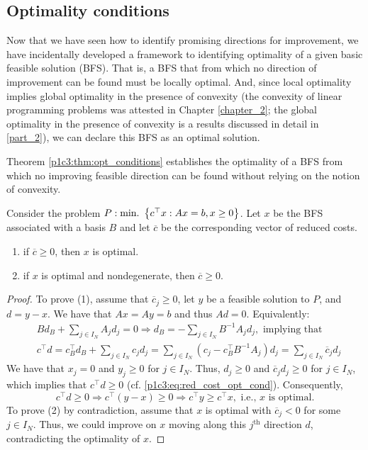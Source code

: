 \subsection{Optimality conditions}

Now that we have seen how to identify promising directions for improvement, we have incidentally developed a framework to identifying optimality of a given basic feasible solution (BFS). That is, a BFS that from which no direction of improvement can be found must be locally optimal. And, since local optimality implies global optimality in the presence of convexity (the convexity of linear programming problems was attested in Chapter \ref{chapter_2}; the global optimality in the presence of convexity is a results discussed in detail in \ref{part_2}), we can declare this BFS as an optimal solution. 

Theorem \ref{p1c3:thm:opt_conditions} establishes the optimality of a BFS from which no improving feasible direction can be found without relying on the notion of convexity.

\begin{theorem}\label{p1c3:thm:opt_conditions}
	Consider the problem $P : \mathop{\text{min.~}}\left\{ c^\top x : Ax = b, x \geq 0 \right \}$. Let $x$ be the BFS associated with a basis $B$ and let $\overline{c}$ be the corresponding vector of reduced costs.
	\begin{enumerate}
		\item if $\overline{c} \geq 0$, then $x$ is optimal.
		\item if $x$ is optimal and nondegenerate, then $\overline{c} \geq 0$.	
	\end{enumerate}
\end{theorem}

\begin{proof}
To prove (1), assume that $\overline{c}_j \geq 0$, let $y$ be a feasible solution to $P$, and $d = y - x$. We have that $Ax = Ay = b$ and thus $Ad = 0$. Equivalently:
%
\begin{align}
	&B d_B + \sum_{j \in I_N}A_j d_j = 0 \Rightarrow d_B = - \sum_{j \in I_N}B^{-1}A_jd_j, \text{ implying that } \nonumber \\
	&c^\top d = c_B^\top d_B + \sum_{j \in I_N}c_jd_j= \sum_{j \in I_N} (c_j - c_B^\top B^{-1}A_j)d_j = \sum_{j \in I_N}\overline{c}_jd_j \label{p1c3:eq:red_cost_opt_cond}
\end{align}
%
We have that $x_j = 0$ and $y_j \geq 0$	for $j \in I_N$. Thus, $d_j \geq 0$ and $\overline{c}_jd_j \geq 0$ for $j \in I_N$, which implies that $c^\top d \geq 0$ (cf. \eqref{p1c3:eq:red_cost_opt_cond}). Consequently,
%
\begin{equation*}
	c^\top d \geq 0 \Rightarrow	c^\top (y - x) \geq 0 \Rightarrow c^\top y \geq c^\top x, \text{ i.e., $x$ is optimal.}
\end{equation*}
%
To prove (2) by contradiction, assume that $x$ is optimal with $\overline{c}_j < 0$ for some $j \in I_N$. Thus, we could improve on $x$ moving along this $j^\text{th}$ direction $d$, contradicting the optimality of $x$.
\end{proof}

